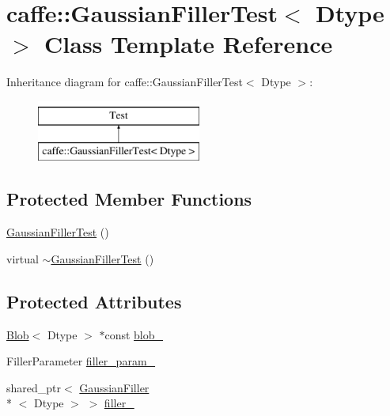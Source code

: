 \hypertarget{classcaffe_1_1_gaussian_filler_test}{\section{caffe\+:\+:Gaussian\+Filler\+Test$<$ Dtype $>$ Class Template Reference}
\label{classcaffe_1_1_gaussian_filler_test}
}
Inheritance diagram for caffe\+:\+:Gaussian\+Filler\+Test$<$ Dtype $>$\+:\begin{figure}[H]
\begin{center}
\leavevmode
\includegraphics[height=2.000000cm]{classcaffe_1_1_gaussian_filler_test}
\end{center}
\end{figure}
\subsection*{Protected Member Functions}
\begin{DoxyCompactItemize}
\item 
\hyperlink{classcaffe_1_1_gaussian_filler_test_a9fd1e4e7a587870532c7b9bb55c979bc}{Gaussian\+Filler\+Test} ()
\item 
virtual \hyperlink{classcaffe_1_1_gaussian_filler_test_a242e8fbb3efc03492226cc43ca698041}{$\sim$\+Gaussian\+Filler\+Test} ()
\end{DoxyCompactItemize}
\subsection*{Protected Attributes}
\begin{DoxyCompactItemize}
\item 
\hyperlink{classcaffe_1_1_blob}{Blob}$<$ Dtype $>$ $\ast$const \hyperlink{classcaffe_1_1_gaussian_filler_test_a2bf1c6d059d5a2ddd346582a6e8e5f75}{blob\+\_\+}
\item 
Filler\+Parameter \hyperlink{classcaffe_1_1_gaussian_filler_test_a9043c61c0efe496faf5e8ba603d79395}{filler\+\_\+param\+\_\+}
\item 
shared\+\_\+ptr$<$ \hyperlink{classcaffe_1_1_gaussian_filler}{Gaussian\+Filler}\\*
$<$ Dtype $>$ $>$ \hyperlink{classcaffe_1_1_gaussian_filler_test_a742c237b4c3e81179d080f4122f2e92e}{filler\+\_\+}
\end{DoxyCompactItemize}


